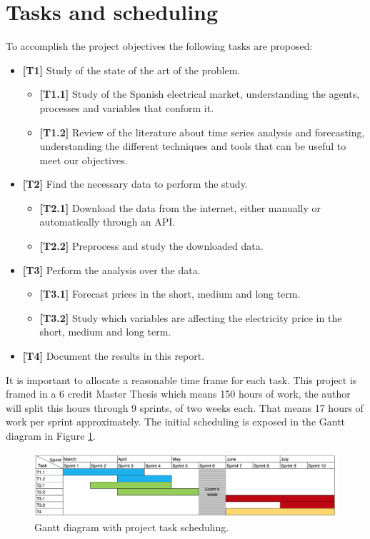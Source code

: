 \section{Tasks and scheduling}
To accomplish the project objectives the following tasks are proposed:
\begin{itemize}
    \item \textbf{[T1]} Study of the state of the art of the problem.
    \begin{itemize}
        \item \textbf{[T1.1]} Study of the Spanish electrical market, understanding the agents, processes and variables that conform it.
        \item \textbf{[T1.2]} Review of the literature about time series analysis and forecasting, understanding the different techniques and tools that can be useful to meet our objectives.
    \end{itemize}
    \item \textbf{[T2]} Find the necessary data to perform the study.
    \begin{itemize}
        \item \textbf{[T2.1]} Download the data from the internet, either manually or automatically through an API.
        \item \textbf{[T2.2]} Preprocess and study the downloaded data.
    \end{itemize}
    \item \textbf{[T3]} Perform the analysis over the data.
    \begin{itemize}
        \item \textbf{[T3.1]} Forecast prices in the short, medium and long term.
        \item \textbf{[T3.2]} Study which variables are affecting the electricity price in the short, medium and long term.
    \end{itemize}
    \item \textbf{[T4]} Document the results in this report.
\end{itemize}

It is important to allocate a reasonable time frame for each task.
This project is framed in a 6 credit Master Thesis which means 150 hours of work, the author will split this hours through 9 sprints, of two weeks each. That means 17 hours of work per sprint approximately. The initial scheduling is exposed in the Gantt diagram in Figure \ref{fig:planning-gantt}.

\begin{figure}[H]
\centering
    \caption{Gantt diagram with project task scheduling.}
    \label{fig:planning-gantt}
    \includegraphics[scale=0.35]{images/planning/planning_gantt}
\end{figure}